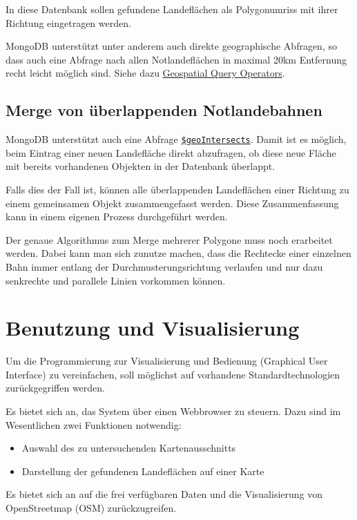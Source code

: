 \documentclass[
11pt, %
a4paper, %
oneside, %
pdfspacing, %
headinclude,
BCOR5mm, %
ngerman, %
bibtotocnumbered,
]{scrartcl}
\begin{document}
In diese Datenbank sollen gefundene Landeflächen als Polygonumriss mit ihrer Richtung eingetragen werden.

MongoDB unterstützt unter anderem auch direkte geographische Abfragen, so dass auch eine Abfrage nach allen Notlandeflächen in maximal 20km Entfernung recht leicht möglich sind. Siehe dazu \href{https://docs.mongodb.com/manual/reference/operator/query-geospatial/}{Geospatial Query Operators}.

\subsection{Merge von überlappenden Notlandebahnen}

MongoDB unterstützt auch eine Abfrage \href{https://docs.mongodb.com/manual/reference/operator/query/geoIntersects/#op._S_geoIntersects}{\texttt{\$geoIntersects}}. Damit ist es möglich, beim Eintrag einer neuen Landefläche direkt abzufragen, ob diese neue Fläche mit bereits vorhandenen Objekten in der Datenbank überlappt. 

Falls dies der Fall ist, können alle überlappenden Landeflächen einer Richtung zu einem gemeinsamen Objekt zusammengefasst werden. Diese Zusammenfassung kann in einem eigenen Prozess durchgeführt werden. 

Der genaue Algorithmus zum Merge mehrerer Polygone muss noch erarbeitet werden. Dabei kann man sich zunutze machen, dass die Recht\-ecke einer einzelnen Bahn immer entlang der Durchmusterungsrichtung verlaufen und nur dazu senkrechte und parallele Linien vorkommen können. 

\section{Benutzung und Visualisierung}

Um die Programmierung zur Visualisierung und Bedienung (Graphical User Interface) zu vereinfachen, soll möglichst auf vorhandene Standardtechnologien zurückgegriffen werden.

Es bietet sich an, das System über einen Webbrowser zu steuern. Dazu sind im Wesentlichen zwei Funktionen notwendig:
\begin{itemize}
	\item Auswahl des zu untersuchenden Kartenausschnitts
	\item Darstellung der gefundenen Landeflächen auf einer Karte
\end{itemize}

Es bietet sich an auf die frei verfügbaren Daten und die Visualisierung von OpenStreetmap (OSM) zurückzugreifen. 
\end{document}
